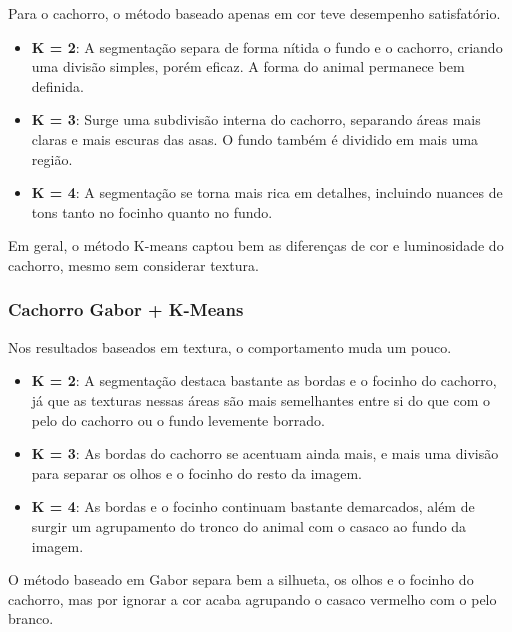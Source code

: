 \documentclass[../main.tex]{subfiles}
\begin{document}

Para o cachorro, o método baseado apenas em cor teve desempenho satisfatório.

\begin{itemize}
    \item \textbf{K = 2}: A segmentação separa de forma nítida o fundo e o cachorro, criando uma divisão simples, porém eficaz. A forma do animal permanece bem definida.
    \item \textbf{K = 3}: Surge uma subdivisão interna do cachorro, separando áreas mais claras e mais escuras das asas. O fundo também é dividido em mais uma região.
    \item \textbf{K = 4}: A segmentação se torna mais rica em detalhes, incluindo nuances de tons tanto no focinho quanto no fundo.
\end{itemize}

Em geral, o método K-means captou bem as diferenças de cor e luminosidade do cachorro, mesmo sem considerar textura.

\subsubsection{Cachorro Gabor + K-Means}


Nos resultados baseados em textura, o comportamento muda um pouco.

\begin{itemize}
    \item \textbf{K = 2}: A segmentação destaca bastante as bordas e o focinho do cachorro, já que as texturas nessas áreas são mais semelhantes entre si do que com o pelo do cachorro ou o fundo levemente borrado.
    \item \textbf{K = 3}: As bordas do cachorro se acentuam ainda mais, e mais uma divisão para separar os olhos e o focinho do resto da imagem.
    \item \textbf{K = 4}: As bordas e o focinho continuam bastante demarcados, além de surgir um agrupamento do tronco do animal com o casaco ao fundo da imagem.
\end{itemize}

O método baseado em Gabor separa bem a silhueta, os olhos e o focinho do cachorro, mas por ignorar a cor acaba agrupando o casaco vermelho com o pelo branco.
\end{document}

